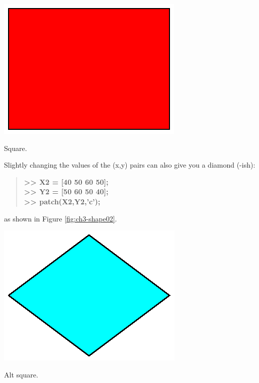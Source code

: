 \documentclass{tufte-book} %
\newenvironment{docspecbold}{\begin{quotation}\ttfamily\bfseries\parskip0pt\parindent0pt\ignorespaces}{\end{quotation}}
\begin{document}
\begin{marginfigure}[-2.0in]
\includegraphics[width=\linewidth]{ch3-shape01.eps}
\caption{Square.}
\label{fig:ch3-shape01}
\end{marginfigure}

\vspace{1mm}
Slightly changing the values of the (x,y) pairs can also give you a diamond (-ish):
\begin{docspecbold}
>> X2 = [40 50 60 50];\\
>> Y2 = [50 60 50 40];\\
>> patch(X2,Y2,'c');
\end{docspecbold}
as shown in Figure \ref{fig:ch3-shape02}.

\begin{marginfigure}[-1.0in]
\includegraphics[width=\linewidth]{ch3-shape02.eps}
\caption{Alt square.}
\label{fig:ch3-shape02}
\end{marginfigure}
\end{document}
